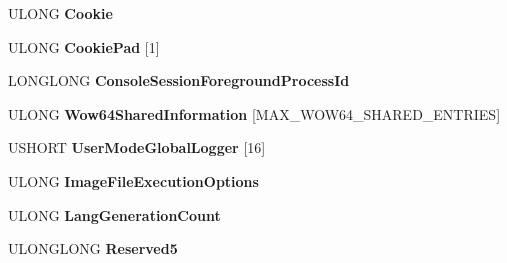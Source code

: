 \begin{DoxyCompactItemize}
\begin{tabbing}
\end{tabbing}\item 
\mbox{\label{struct___k_u_s_e_r___s_h_a_r_e_d___d_a_t_a_aaace833da1205f615b2bc736382fc29e}} 
U\+L\+O\+NG {\bfseries Cookie}
\item 
\mbox{\label{struct___k_u_s_e_r___s_h_a_r_e_d___d_a_t_a_a07ff995168ebd515dcf52d21e968569f}} 
U\+L\+O\+NG {\bfseries Cookie\+Pad} \mbox{[}1\mbox{]}
\item 
\mbox{\label{struct___k_u_s_e_r___s_h_a_r_e_d___d_a_t_a_a6aa521d037157a284fc9b2905fb3402c}} 
L\+O\+N\+G\+L\+O\+NG {\bfseries Console\+Session\+Foreground\+Process\+Id}
\item 
\mbox{\label{struct___k_u_s_e_r___s_h_a_r_e_d___d_a_t_a_a74b9399fa11ea3921666c97942898ca9}} 
U\+L\+O\+NG {\bfseries Wow64\+Shared\+Information} \mbox{[}M\+A\+X\+\_\+\+W\+O\+W64\+\_\+\+S\+H\+A\+R\+E\+D\+\_\+\+E\+N\+T\+R\+I\+ES\mbox{]}
\item 
\mbox{\label{struct___k_u_s_e_r___s_h_a_r_e_d___d_a_t_a_afbfb19611d50356b2f31457439e9b613}} 
U\+S\+H\+O\+RT {\bfseries User\+Mode\+Global\+Logger} \mbox{[}16\mbox{]}
\item 
\mbox{\label{struct___k_u_s_e_r___s_h_a_r_e_d___d_a_t_a_ac287dd622701c9416c90234c48408b35}} 
U\+L\+O\+NG {\bfseries Image\+File\+Execution\+Options}
\item 
\mbox{\label{struct___k_u_s_e_r___s_h_a_r_e_d___d_a_t_a_a070b3c54b330fd22f1db9954fc855d9f}} 
U\+L\+O\+NG {\bfseries Lang\+Generation\+Count}
\item 
\mbox{\label{struct___k_u_s_e_r___s_h_a_r_e_d___d_a_t_a_a8038632863b5aba19f8a7d2dd8c44c83}} 
U\+L\+O\+N\+G\+L\+O\+NG {\bfseries Reserved5}
\item 
\mbox{\label{struct___k_u_s_e_r___s_h_a_r_e_d___d_a_t_a_a5f1868cfa0a667d7c53eedb3b00f2e52}} 

\end{DoxyCompactItemize}
